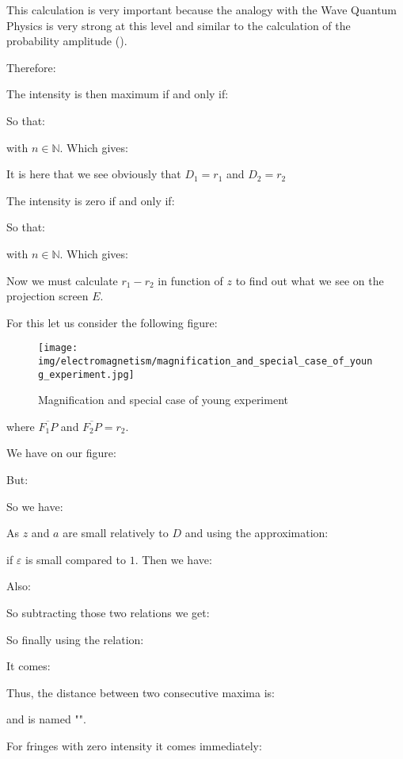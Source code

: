 	\begin{tcolorbox}[title=Remark,colframe=black,arc=10pt]
	This calculation is very important because the analogy with the Wave Quantum Physics is very strong at this level and similar to the calculation of the probability amplitude ().
	\end{tcolorbox}
	Therefore:
	
	The intensity is then maximum if and only if:
	
	So that:
	
	with $n\in\mathbb{N}$. Which gives:
	
	\begin{tcolorbox}[title=Remark,colframe=black,arc=10pt]
	It is here that we see obviously that $D_1=r_1$ and $D_2=r_2$
	\end{tcolorbox}
	The intensity is zero if and only if:
	
	So that:
	
	with $n\in\mathbb{N}$. Which gives:
	
	Now we must calculate $r_1-r_2$ in function of $z$ to find out what we see on the projection screen $E$.
	
	For this let us consider the following figure:
	\begin{figure}[H]
		\centering
		\texttt{[image: img/electromagnetism/magnification\_and\_special\_case\_of\_young\_experiment.jpg]}
		\caption[]{Magnification and special case of young experiment}
	\end{figure}
	where $\overline{F_1P}$ and $\overline{F_2P}=r_2$.
	
	We have on our figure:
	
	But:
	
	So we have:
	
	As $z$ and $a$ are small relatively to $D$ and using the approximation:
	
	if $\varepsilon$ is small compared to $1$. Then we have:
	
	Also:
	
	So subtracting those two relations we get:
	
	So finally using the relation:
	
	It comes:
	
	Thus, the distance between two consecutive maxima is:
		
	and is named "".

	For fringes with zero intensity it comes immediately:
	
